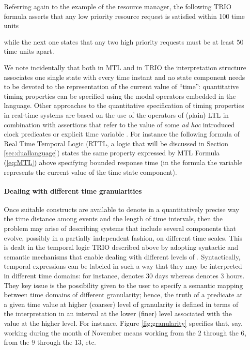 Referring again to the example of the resource manager, the following 
TRIO formula asserts that any low priority resource request is 
satisfied within 100 time units 

while the next one states that any two high priority requests 
must be at least 50 time units apart. 


We note incidentally that both in MTL and in TRIO the interpretation 
structure associates one single state with every time instant 
and no  state component needs to be devoted to the representation 
of the current value of ``time'': quantitative timing properties 
can be specified using the modal operators embedded in the language. 
Other approaches to the quantitative specification of timing 
properties in real-time systems are based on the use of the operators 
of (plain) LTL in combination with assertions that refer to the 
value of some \emph{ad hoc} introduced clock predicates or explicit 
time variable \cite{Ost89}. For instance the following formula of 
Real Time Temporal Logic (RTTL, a logic that will be discussed 
in Section \ref{sec:duallanguage}) states the same property expressed by 
MTL Formula (\ref{eq:MTL}) above specifying bounded response time (in 
the formula the variable  represents the current value of 
the time state component). 




\paragraph{Dealing with different time granularities}
Once suitable constructs are available to denote in a quantitatively
precise way the time distance among events and the length of time
intervals, then the problem may arise of describing systems that
include several components that evolve, possibly in a partially
independent fashion, on different time scales. This is dealt in the
temporal logic TRIO described above by adopting syntactic and semantic
mechanisms that enable dealing with different levels of  \cite{CCM+91}.
 Syntactically, temporal expressions can be
labeled in such a way that they may be interpreted in different time
domains: for instance,  denotes 30 days whereas  denotes 3
hours. They key issue is the possibility given to the user to specify
a semantic mapping between time domains of different granularity;
hence, the truth of a predicate at a given time value at higher
(coarser) level of granularity is defined in terms of the
interpretation in an interval at the lower (finer) level associated
with the value at the higher level. For instance, Figure
\ref{fig:granularity} specifies that, say, working during the month of
November means working from the 2 through the 6, from the 9
through the 13, etc.

